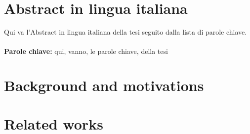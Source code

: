 \documentclass{Configuration_Files/PoliMi3i_thesis}
\begin{document}
\chapter*{Abstract in lingua italiana}
Qui va l'Abstract in lingua italiana della tesi seguito dalla lista di parole chiave.
\\
\\
\textbf{Parole chiave:} qui, vanno, le parole chiave, della tesi %


\thispagestyle{empty}
\tableofcontents %
\thispagestyle{empty}
\cleardoublepage

%
%
%    
%

\mainmatter %

\chapter{Background and motivations}\label{ch:background}


\chapter{Related works}\label{ch:related_works}

\end{document}
